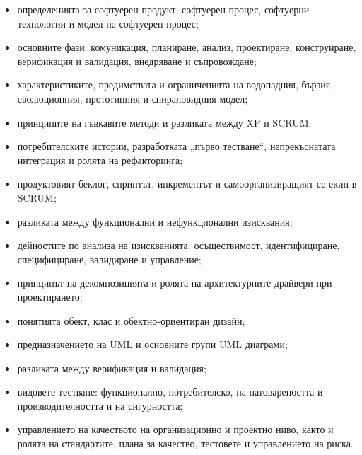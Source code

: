 \begin{itemize}
    \item определенията за софтуерен продукт, софтуерен процес, софтуерни технологии и модел на софтуерен процес;
    \item основните фази: комуникация, планиране, анализ, проектиране, конструиране, верификация и валидация, внедряване и съпровождане;
    \item характеристиките, предимствата и ограниченията на водопадния, бързия, еволюционния, прототипния и спираловидния модел;
    \item принципите на гъвкавите методи и разликата между XP и SCRUM;
    \item потребителските истории, разработката „първо тестване“, непрекъснатата интеграция и ролята на рефакторинга;
    \item продуктовият беклог, спринтът, инкрементът и самоорганизиращият се екип в SCRUM;
    \item разликата между функционални и нефункционални изисквания;
    \item дейностите по анализа на изискванията: осъществимост, идентифициране, специфициране, валидиране и управление;
    \item принципът на декомпозицията и ролята на архитектурните драйвери при проектирането;
    \item понятията обект, клас и обектно-ориентиран дизайн;
    \item предназначението на UML и основните групи UML диаграми;
    \item разликата между верификация и валидация;
    \item видовете тестване: функционално, потребителско, на натовареността и производителността и на сигурността;
    \item управлението на качеството на организационно и проектно ниво, както и ролята на стандартите, плана за качество, тестовете и управлението на риска.
\end{itemize}
